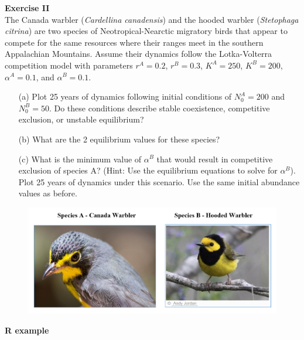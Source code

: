 \documentclass[12pt]{article}\usepackage[]{graphicx}\usepackage[]{color}
\begin{document}
\clearpage

{\bf Exercise II \\}
The Canada warbler (\textit{Cardellina canadensis}) and the hooded
warbler ({\it Stetophaga citrina}) are two species of
Neotropical-Nearctic migratory birds that appear to compete for the
same resources where their ranges meet in the southern Appalachian
Mountains. Assume their dynamics follow the Lotka-Volterra competition
model with parameters $r^{A}=0.2$, $r^{B}=0.3$,
$K^{A}=250$, $K^{B}=200$, $\alpha^{A}=0.1$, and 
$\alpha^{B}=0.1$.   
\begin{enumerate}
  \item[(a)] Plot 25 years of dynamics following initial conditions of 
    $N_0^A = 200$ and $N_0^B=50$. Do these conditions describe stable
    coexistence, competitive exclusion, or unstable equilibrium? 
  \item[(b)] What are the 2 equilibrium values for these species?
  \item[(c)] What is the minimum value of $\alpha^B$ that would result in
    competitive exclusion of species A? (Hint: Use the equilibrium
    equations to solve for $\alpha^B$). Plot 25 years of dynamics under
    this scenario. Use the same initial abundance values as before. 
\end{enumerate}


\vspace{12pt}

\begin{figure}[h!]
  \centering
  \includegraphics[width=\textwidth]{cawa-howa}
  \label{fig:cawa-howa}
\end{figure}


\clearpage

{\bf R example \\}
\end{document}
